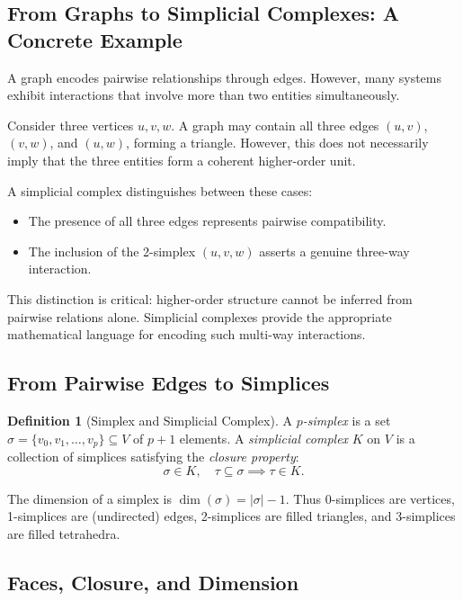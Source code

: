 \documentclass[11pt]{article}
\theoremstyle{definition}
\newtheorem{definition}[theorem]{Definition}
\theoremstyle{remark}
\begin{document}
\subsection{From Graphs to Simplicial Complexes: A Concrete Example}

A graph encodes pairwise relationships through edges. However, many systems exhibit interactions that involve more than two entities simultaneously.

Consider three vertices $u, v, w$. A graph may contain all three edges $(u,v)$, $(v,w)$, and $(u,w)$, forming a triangle. However, this does not necessarily imply that the three entities form a coherent higher-order unit.

A simplicial complex distinguishes between these cases:
\begin{itemize}
    \item The presence of all three edges represents pairwise compatibility.
    \item The inclusion of the 2-simplex $(u,v,w)$ asserts a genuine three-way interaction.
\end{itemize}

This distinction is critical: higher-order structure cannot be inferred from pairwise relations alone. Simplicial complexes provide the appropriate mathematical language for encoding such multi-way interactions.

\subsection{From Pairwise Edges to Simplices}

\begin{definition}[Simplex and Simplicial Complex]
A \emph{$p$-simplex} is a set $\sigma = \{v_0,v_1,\dots,v_p\} \subseteq V$ of
$p+1$ elements. A \emph{simplicial complex} $K$ on $V$ is a collection of
simplices satisfying the \emph{closure property}:
\[
  \sigma \in K,\quad \tau \subseteq \sigma \implies \tau \in K.
\]
\end{definition}

The dimension of a simplex is $\dim(\sigma) = |\sigma|-1$. Thus 0-simplices
are vertices, 1-simplices are (undirected) edges, 2-simplices are filled
triangles, and 3-simplices are filled tetrahedra.

\subsection{Faces, Closure, and Dimension}
\end{document}
